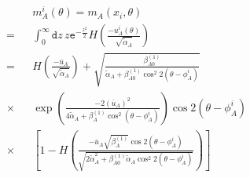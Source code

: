 \begin{eqnarray}
&&m_A^i(\theta) = m_A(x_i, \theta) \nonumber \\
=&& \int_{0}^{\infty} \mathtt{d} z\,  z \mathtt{e}^{-\frac{z^2}{2}} H\left( \frac{-u_A^i(\theta)}{\sqrt{\tilde{\alpha}_A }} \right)  \\
=&& H\left( \frac{-\overline{u}_A }{\sqrt{\tilde{\alpha}_A }}  \right) + \sqrt{\frac{\beta_{A0}^{(1)} }{  \tilde{\alpha}_A + \beta_{A0}^{(1)} \cos^2 2 (\theta - \phi_A^i) }} \nonumber \\ 
\times&&  \exp \left( \frac{-2 \left( \overline{u}_A \right)^2  }{ 4 \tilde{\alpha}_A + \beta_A^{(1)} \cos^2  (\theta - \phi_A^i)}   \right) \cos2(\theta - \phi_A^i) \nonumber \\
\times&& \left[ 1 - H \left( \frac{- \overline{u}_A \sqrt{\beta_A^{(1)} } \cos 2 (\theta - \phi_A^i) } {  \sqrt{2 \tilde{\alpha}^2_A + \beta_{A0}^{(1)} \tilde{\alpha}_A \cos^2 2 (\theta - \phi_A^i) }} \right) \right]  \label{mAiofTheta} 
\end{eqnarray}


